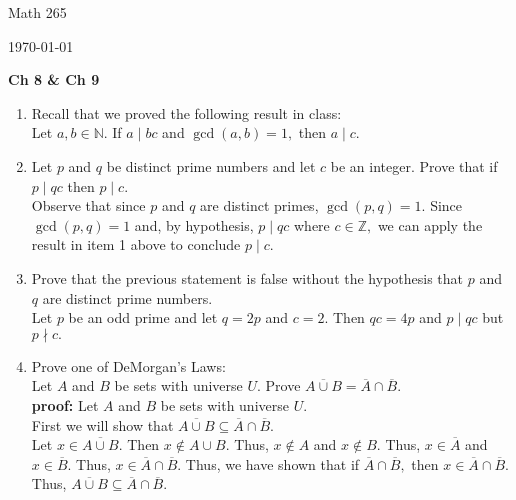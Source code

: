 \documentclass[11pt]{report}
\theoremstyle{plain}
\begin{document}
\hfill Math 265

\hfill \today

\begin{center}
\Large{\textbf{Ch 8 \& Ch 9}} \\
\end{center}
\begin{enumerate}
\item Recall that we proved the following result in class:\\

Let $a,b \in \mathbb{N}.$ If $a \mid bc$ and $\gcd(a,b)=1,$ then $a \mid c.$\\

\item Let $p$ and $q$ be distinct prime numbers and let $c$ be an integer. Prove that if $p\mid qc$ then $p \mid c.$\\

Observe that since $p$ and $q$ are distinct primes, $\gcd(p,q) =1.$ Since $\gcd(p,q) =1$ and, by hypothesis, $p\mid qc$ where $c \in \mathbb{Z},$ we can apply the result in item 1 above to conclude $p \mid c.$\\

\item Prove that the previous statement is false without the hypothesis that $p$ and $q$ are distinct prime numbers. \\

Let $p$ be an odd prime and let $q=2p$ and $c=2.$ Then $qc=4p$ and $p \mid qc$ but $p\nmid c.$\\

\item Prove one of DeMorgan's Laws:\\
Let $A$ and $B$ be sets with universe $U$. Prove $\overline{A \cup B} = \overline{A} \cap \overline{B}.$\\

\textbf{proof:} Let $A$ and $B$ be sets with universe $U$. \\

First we will show that $\overline{A \cup B} \subseteq \overline{A} \cap \overline{B}.$\\

Let $x \in \overline{A \cup B}.$ Then $x \not \in A \cup B.$ Thus, $x\not \in A$ and $x \not \in B. $ Thus, $x \in \overline{A}$ and $x  \in \overline{B}.$ Thus, $x \in \overline{A} \cap \overline{B}.$ Thus, we have shown that if $\overline{A} \cap \overline{B},$ then $x \in \overline{A} \cap \overline{B}.$  Thus, $\overline{A \cup B} \subseteq \overline{A} \cap \overline{B}.$\\



\end{enumerate}
\end{document}
